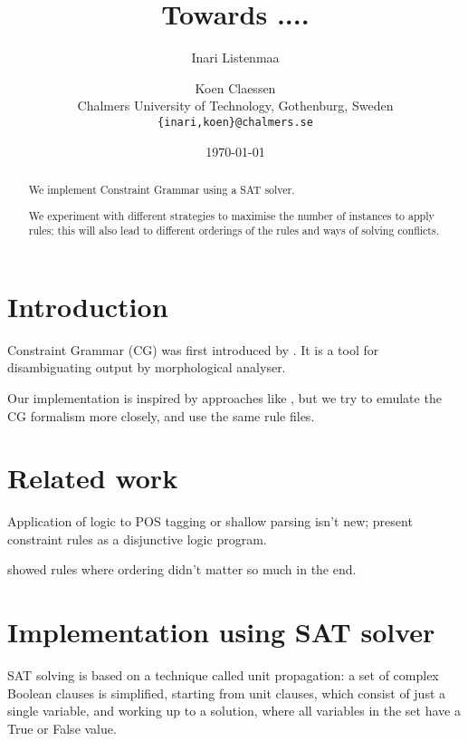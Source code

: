 \documentclass[11pt]{article}
\title{Towards ....}
\author{Inari Listenmaa \and Koen Claessen \\
  Chalmers University of Technology, Gothenburg, Sweden \\
  {\tt \{inari,koen\}@chalmers.se} }
\date{\today}
\begin{document}
\maketitle
\begin{abstract}
We implement Constraint Grammar using a SAT solver.

We experiment with different strategies to maximise the number of instances to apply rules;
this will also lead to different orderings of the rules and ways of solving conflicts.


\end{abstract}


\section{Introduction}
Constraint Grammar (CG) was first introduced by \cite{karlsson1995constraint}. 
It is a tool for disambiguating output by morphological analyser.

Our implementation is inspired by approaches like \cite{lager98,lager_nivre01},
but we try to emulate the CG formalism more closely, and use the same rule files.

\section{Related work}
\label{sect:related}

Application of logic to POS tagging or shallow parsing isn't new;
\cite{lager98,lager_nivre01} present constraint rules as 
a disjunctive logic program.

\cite{lindberg_eineborg98ilp,asfrent14}


\cite{lager01transformation} showed rules where ordering didn't matter so much in the end.



\section{Implementation using SAT solver}
\label{sect:pdf}

SAT solving is based on a technique called unit propagation:
a set of complex Boolean clauses is simplified, starting from unit
clauses, which consist of just a single variable, and working up to a
solution, where all variables in the set have a True or False value.
\end{document}
